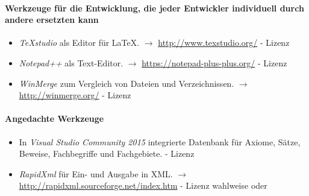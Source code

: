 \documentclass[english,ngerman,parskip=half,headsepline,footsepline]{scrreprt}
\newcounter{Enumi}
\begin{document}
	\paragraph{Werkzeuge für die Entwicklung, die jeder Entwickler individuell durch andere ersetzten kann}
	\begin{itemize}
		\setcounter{enumi}{\value{Enumi}}
		
		\item\label{Werkzeug:TeXstudio}\emph{\TeX studio} als Editor für \LaTeX. $\rightarrow$ \url{http://www.texstudio.org/} - Lizenz \cite{bib:GPLii}
		
		\item\label{Werkzeug:Notepadpp}\emph{Notepad++} als Text-Editor. $\rightarrow$ \url{https://notepad-plus-plus.org/} - Lizenz \cite{bib:GPLi}
		
		\item\label{Werkzeug:WinMerge}\emph{WinMerge} zum Vergleich von Dateien und Verzeichnissen. $\rightarrow$ \url{http://winmerge.org/} - Lizenz \cite{bib:GPLi}
		
		\setcounter{Enumi}{\value{enumi}}
	\end{itemize}
	
	\paragraph{Angedachte Werkzeuge}
	\begin{itemize}
		\setcounter{enumi}{\value{Enumi}}
		
		\item\label{Werkzeug:VSC DB}In \emph{Visual Studio Community 2015} integrierte Datenbank für Axiome, Sätze, Beweise, Fachbegriffe und Fachgebiete. - Lizenz \cite{bib:EULA}
		
		\item\label{Werkzeug:RapidXml}\emph{RapidXml} für Ein- und Ausgabe in XML. $\rightarrow$ \url{http://rapidxml.sourceforge.net/index.htm} - Lizenz wahlweise \cite{bib:BSLi} oder \cite{bib:MIT}
		
	\end{itemize}
	
\end{document}
